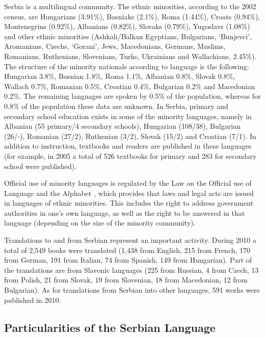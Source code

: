 {\begin{multicols}{2}

Serbia is a multilingual community. The ethnic minorities, \cite{Ombudsman} according to the 2002 census, are Hungarians (3.91\%), Bosniaks (2.1\%), Roma (1.44\%), Croats (0.94\%), Montenegrins (0.92\%), Albanians (0.82\%), Slovaks (0.79\%), Yugoslavs (1.08\%) and other ethnic minorities (Ashkali/Balkan Egyptians, Bulgarians, ‘Bunjevci’, Aromanians, Czechs, ‘Gorani’, Jews, Macedonians, Germans, Muslims, Romanians, Ruthenians, Slovenians, Turks, Ukrainians and Wallachians, 2.45\%).  The structure of the minority nationals according to language is the following: Hungarian 3.8\%,  Bosnian 1.8\%,  Roma 1.1\%,  Albanian 0.8\%,  Slovak 0.8\%, Wallach 0.7\%, Romanian 0.5\%,  Croatian 0.4\%,  Bulgarian 0.2\% and Macedonian 0.2\%.  The remaining languages are spoken by 0.5\% of the population, whereas for 0.8\% of the population these data are unknown. In Serbia, primary and secondary school education exists in some of the minority languages, namely in Albanian (55 primary/4 secondary schools), Hungarian (108/38), Bulgarian (26/-), Romanian (27/2), Ruthenian (3/2), Slovak (15/2) and Croatian (7/1). \cite{GOD2010} In addition to instruction, textbooks and readers are published in these languages (for example, in 2005 a total of 526 textbooks for primary and 283 for secondary school were published). \cite{HDR} 

Official use of minority languages is regulated by the Law on the Official use of Language and the Alphabet \cite{SGRS},  which provides that laws and legal acts are issued in languages of ethnic minorities. This includes the right to address government authorities in one’s own language, as well as the right to be answered in that language (depending on the size of the minority community).

Translations to and from Serbian represent an important activity. During 2010 a total of 2,549 books were translated (1,438 from English, 215 from French, 170 from German, 191 from Italian, 74 from Spanish, 149 from Hungarian). Part of the translations are from Slavonic languages (225 from Russian, 4 from Czech, 13 from Polish, 21 from Slovak, 19 from Slovenian, 18 from Macedonian, 12 from Bulgarian). As for translations from Serbian into other languages, 591 works were published in 2010. 

\subsection{Particularities of the Serbian Language}


\end{multicols}}
